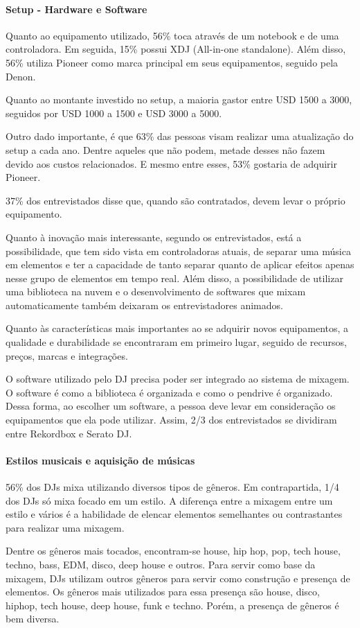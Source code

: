 \paragraph{Setup - Hardware e Software}
Quanto ao equipamento utilizado, 56\% toca através de um notebook e de uma controladora. Em seguida, 15\% possui XDJ (All-in-one standalone). Além disso, 56\% utiliza Pioneer como marca principal em seus equipamentos, seguido pela Denon. 
\par
Quanto ao montante investido no setup, a maioria gastor entre USD 1500 a 3000, seguidos por USD 1000 a 1500 e USD 3000 a 5000.
\par
Outro dado importante, é que 63\% das pessoas visam realizar uma atualização do setup a cada ano. Dentre aqueles que não podem, metade desses não fazem devido aos custos relacionados. E mesmo entre esses, 53\% gostaria de adquirir Pioneer. 
\par
37\% dos entrevistados disse que, quando são contratados, devem levar o próprio equipamento.
\par
Quanto à inovação mais interessante, segundo os entrevistados, está a possibilidade, que tem sido vista em controladoras atuais, de separar uma música em elementos e ter a capacidade de tanto separar quanto de aplicar efeitos apenas nesse grupo de elementos em tempo real. Além disso, a possibilidade de utilizar uma biblioteca na nuvem e o desenvolvimento de softwares que mixam automaticamente também deixaram os entrevistadores animados. 
\par
Quanto às características mais importantes ao se adquirir novos equipamentos, a qualidade e durabilidade se encontraram em primeiro lugar, seguido de recursos, preços, marcas e integrações.
\par
O software utilizado pelo DJ precisa poder ser integrado ao sistema de mixagem. O software é como a biblioteca é organizada e como o pendrive é organizado. Dessa forma, ao escolher um software, a pessoa deve levar em consideração os equipamentos que ela pode utilizar. Assim, 2/3 dos entrevistados se dividiram entre Rekordbox e Serato DJ.
\paragraph{Estilos musicais e aquisição de músicas}
56\% dos DJs mixa utilizando diversos tipos de gêneros. Em contrapartida, 1/4 dos DJs só mixa focado em um estilo. A diferença entre a mixagem entre um estilo e vários é a habilidade de elencar elementos semelhantes ou contrastantes para realizar uma mixagem.
\par
Dentre os gêneros mais tocados, encontram-se house, hip hop, pop, tech house, techno, bass, EDM, disco, deep house e outros. Para servir como base da mixagem, DJs utilizam outros gêneros para servir como construção e presença de elementos. Os gêneros mais utilizados para essa presença são house, disco, hiphop, tech house, deep house, funk e techno. Porém, a presença de gêneros é bem diversa. 

